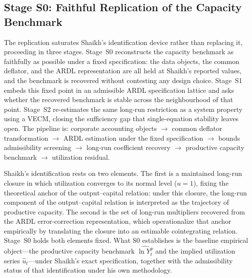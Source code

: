\documentclass[11pt,a4paper]{article}
\begin{document}

\subsection{Stage S0: Faithful Replication of the Capacity Benchmark}
\label{subsec:S0_shaikh_replication}


The replication saturates Shaikh's identification device rather
than replacing it, proceeding in three stages. Stage~S0 reconstructs the
capacity benchmark as faithfully as possible under a fixed specification:
the data objects, the common deflator, and the ARDL representation are all
held at Shaikh's reported values, and the benchmark is recovered without
contesting any design choice. Stage~S1 embeds this fixed point in an
admissible ARDL specification lattice and asks whether the recovered
benchmark is stable across the neighbourhood of that point. Stage~S2
re-estimates the same long-run restriction as a system property using a
VECM, closing the sufficiency gap that single-equation stability leaves
open. The pipeline is: corporate accounting objects $\to$ common deflator
transformation $\to$ ARDL estimation under the fixed specification $\to$
bounds admissibility screening $\to$ long-run coefficient recovery $\to$
productive capacity benchmark $\to$ utilization residual.


Shaikh's identification rests on two elements. The first is a maintained
long-run closure in which utilization converges to its normal level
($u = 1$), fixing the theoretical anchor of the output--capital relation:
under this closure, the long-run component of the output--capital relation
is interpreted as the trajectory of productive capacity. The second is the
set of long-run multipliers recovered from the ARDL error-correction
representation, which operationalize that anchor empirically by translating
the closure into an estimable cointegrating relation. Stage~S0 holds
both elements fixed. What S0 establishes is the baseline empirical
object---the productive capacity benchmark $\widehat{\ln Y_t^p}$ and the
implied utilization series $\widehat{u}_t$---under Shaikh's exact
specification, together with the admissibility status of that
identification under his own methodology.
\end{document}
